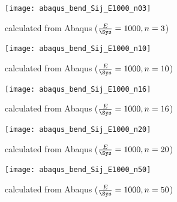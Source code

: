 \begin{figure}[tbp]
\centering
\texttt{[image: abaqus\_bend\_Sij\_E1000\_n03]}
\caption{\Sij calculated from Abaqus (\(\frac{E}{\Sys}=1000, n=3\))\label{fig:abaqus_Sij_E1000_n03}}
\end{figure}

\begin{figure}[tbp]
\centering
\texttt{[image: abaqus\_bend\_Sij\_E1000\_n10]}
\caption{\Sij calculated from Abaqus (\(\frac{E}{\Sys}=1000, n=10\))\label{fig:abaqus_Sij_E1000_n10}}
\end{figure}

\begin{figure}[tbp]
\centering
\texttt{[image: abaqus\_bend\_Sij\_E1000\_n16]}
\caption{\Sij calculated from Abaqus (\(\frac{E}{\Sys}=1000, n=16\))\label{fig:abaqus_Sij_E1000_n16}}
\end{figure}

\begin{figure}[tbp]
\centering
\texttt{[image: abaqus\_bend\_Sij\_E1000\_n20]}
\caption{\Sij calculated from Abaqus (\(\frac{E}{\Sys}=1000, n=20\))\label{fig:abaqus_Sij_E1000_n20}}
\end{figure}

\begin{figure}[tbp]
\centering
\texttt{[image: abaqus\_bend\_Sij\_E1000\_n50]}
\caption{\Sij calculated from Abaqus (\(\frac{E}{\Sys}=1000, n=50\))\label{fig:abaqus_Sij_E1000_n50}}
\end{figure}
